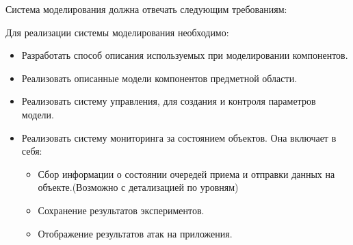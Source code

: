 \documentclass[12pt]{report}
\begin{document}
    Система моделирования должна отвечать следующим требованиям:


    Для реализации системы моделирования необходимо:

    \begin{itemize}
        \item Разработать способ описания используемых при моделировании компонентов.
        \item Реализовать описанные модели компонентов предметной области.
        \item Реализовать систему управления, для создания и контроля параметров модели.
        \item Реализовать систему мониторинга за состоянием объектов. Она включает в себя:
            \begin{itemize}
                \item Сбор информации о состоянии очередей приема и отправки данных на объекте.(Возможно с детализацией по уровням)
                \item Сохранение результатов экспериментов.
                \item Отображение результатов атак на приложения.
            \end{itemize}
    \end{itemize}





\end{document}
